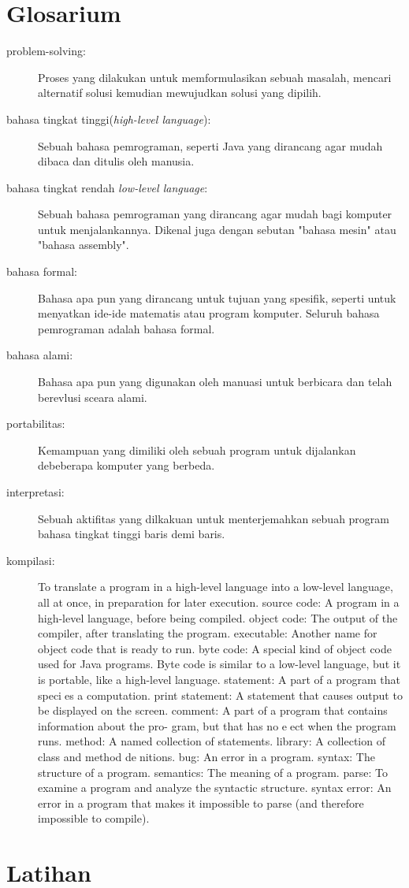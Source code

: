 \section{Glosarium}
\begin{description}
	\item[problem-solving:] Proses yang dilakukan untuk memformulasikan sebuah masalah, mencari alternatif solusi kemudian mewujudkan solusi yang dipilih.
	\item[bahasa tingkat tinggi(\textit{high-level language}):] Sebuah bahasa pemrograman, seperti Java yang dirancang agar mudah dibaca dan ditulis oleh manusia.
	\item[bahasa tingkat rendah \textit{low-level language}:] Sebuah bahasa pemrograman yang dirancang agar mudah bagi komputer untuk menjalankannya. Dikenal juga dengan sebutan "bahasa mesin" atau "bahasa assembly".
	\item[bahasa formal:] Bahasa apa pun yang dirancang untuk tujuan yang spesifik, seperti untuk menyatkan ide-ide matematis atau program komputer. Seluruh bahasa pemrograman adalah bahasa formal.
	\item[bahasa alami:] Bahasa apa pun yang digunakan oleh manuasi untuk berbicara dan telah berevlusi sceara alami.
	\item[portabilitas:] Kemampuan yang dimiliki oleh sebuah program untuk dijalankan debeberapa komputer yang berbeda.
	\item[interpretasi:] Sebuah aktifitas yang dilkakuan untuk menterjemahkan sebuah program bahasa tingkat tinggi baris demi baris.
	\item[kompilasi:] To translate a program in a high-level language into a low-level
	language, all at once, in preparation for later execution.
	source code: A program in a high-level language, before being compiled.
	object code: The output of the compiler, after translating the program.
	executable: Another name for object code that is ready to run.
	byte code: A special kind of object code used for Java programs. Byte code
	is similar to a low-level language, but it is portable, like a high-level
	language.
	statement: A part of a program that species a computation.
	print statement: A statement that causes output to be displayed on the
	screen.
	comment: A part of a program that contains information about the pro-
	gram, but that has no eect when the program runs.
	method: A named collection of statements.
	library: A collection of class and method denitions.
	bug: An error in a program.
	syntax: The structure of a program.
	semantics: The meaning of a program.
	parse: To examine a program and analyze the syntactic structure.
	syntax error: An error in a program that makes it impossible to parse (and
	therefore impossible to compile).
	
\end{description}
\section{Latihan}